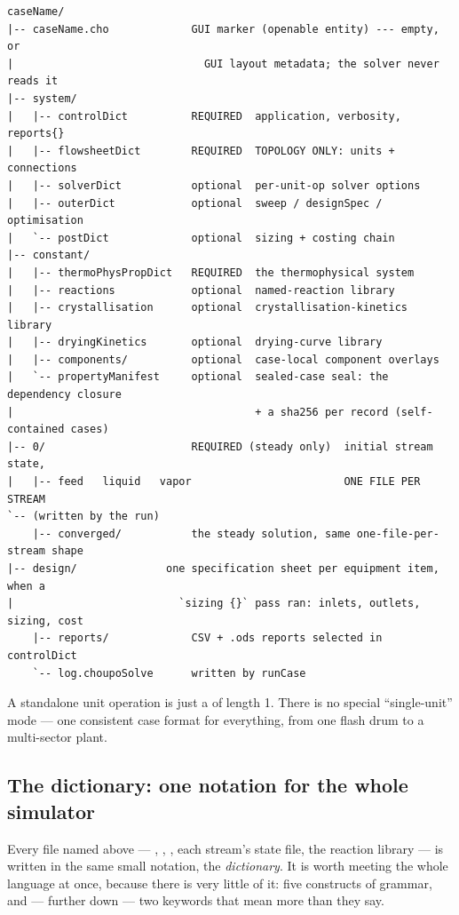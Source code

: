 \documentclass[11pt,a4paper]{article}
\begin{document}
\begin{lstlisting}
caseName/
|-- caseName.cho             GUI marker (openable entity) --- empty, or
|                              GUI layout metadata; the solver never reads it
|-- system/
|   |-- controlDict          REQUIRED  application, verbosity, reports{}
|   |-- flowsheetDict        REQUIRED  TOPOLOGY ONLY: units + connections
|   |-- solverDict           optional  per-unit-op solver options
|   |-- outerDict            optional  sweep / designSpec / optimisation
|   `-- postDict             optional  sizing + costing chain
|-- constant/
|   |-- thermoPhysPropDict   REQUIRED  the thermophysical system
|   |-- reactions            optional  named-reaction library
|   |-- crystallisation      optional  crystallisation-kinetics library
|   |-- dryingKinetics       optional  drying-curve library
|   |-- components/          optional  case-local component overlays
|   `-- propertyManifest     optional  sealed-case seal: the dependency closure
|                                      + a sha256 per record (self-contained cases)
|-- 0/                       REQUIRED (steady only)  initial stream state,
|   |-- feed   liquid   vapor                        ONE FILE PER STREAM
`-- (written by the run)
    |-- converged/           the steady solution, same one-file-per-stream shape
|-- design/              one specification sheet per equipment item, when a
|                          `sizing {}` pass ran: inlets, outlets, sizing, cost
    |-- reports/             CSV + .ods reports selected in controlDict
    `-- log.choupoSolve      written by runCase
\end{lstlisting}

\begin{keyidea}
A standalone unit operation is just a  of length 1.
There is no special ``single-unit'' mode --- one consistent case format
for everything, from one flash drum to a multi-sector plant.
\end{keyidea}

\subsection{The dictionary: one notation for the whole simulator}\label{sec:dict-language}

Every file named above --- , ,
, each stream's state file, the reaction
library --- is written in the same small notation, the \emph{dictionary}.
It is worth meeting the whole language at once, because there is very
little of it: five constructs of grammar, and --- further down --- two
keywords that mean more than they say.
\end{document}
